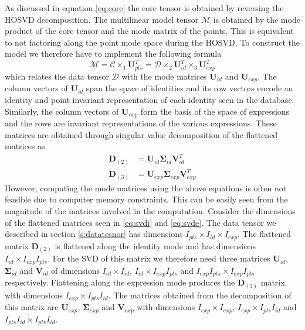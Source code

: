 \documentclass[11pt,a4paper]{report}
\begin{document}
As discussed in equation \ref{eq:core} the core tensor is obtained by reversing
the HOSVD decomposition. The multilinear model tensor $\mathcal{M}$ is obtained
by the mode product of the core tensor and the mode matrix of the points. This
is equivalent to not factoring along the point mode space during the HOSVD.
To construct the model we therefore have to implement the following formula
\begin{equation}\label{eq:model}
\mathcal{M} = \mathcal{C} \times_1 \mathbf{U}_{pts}^T = \mathcal{D} \times_2
\mathbf{U}_{id}^T \times_3 \mathbf{U}_{exp}^T
\end{equation}
which relates the data tensor $\mathcal{D}$ with the mode matrices $\mathbf{U}_{id}$
and $\mathbf{U}_{exp}$. The column vectors of $\mathbf{U}_{id}$ span the space
of identities and its row vectors encode an identity and point invariant
representation of each identity seen in the database. Similarly, the column
vectors of $\mathbf{U}_{exp}$ form the basis of the space of expressions and the
rows are invariant representations of the various expressions. These matrices
are obtained through singular value decomposition of the flattened
matrices as
\begin{align}\label{eq:svdi}
\mathbf{D}_{(2)} &= \mathbf{U}_{id} \mathbf{\Sigma}_{id} \mathbf{V}_{id}^T\\
\label{eq:svde}
\mathbf{D}_{(3)} &= \mathbf{U}_{exp} \mathbf{\Sigma}_{exp} \mathbf{V}_{exp}^T
\end{align}
However, computing the mode matrices using the above equations is often not
feasible due to computer memory constraints. This can be easily seen from the magnitude of the matrices
involved in the computation. Consider the dimensions of the flattened
matrices seen in \ref{eq:svdi} and \ref{eq:svde}. The data tensor we described
in section \ref{s:datatesnor} has
dimensions $I_{pts} \times I_{id} \times I_{exp}$. The flattened matrix
$\mathbf{D}_{(2)}$ is flattened along the identity mode and has dimensions
$I_{id} \times I_{exp}I_{pts}$. For the SVD of this matrix we therefore need
three matrices $\mathbf{U}_{id}$, $\mathbf{\Sigma}_{id}$ and $\mathbf{V}_{id}$
of dimensions $I_{id} \times I_{id}$, $I_{id} \times I_{exp}I_{pts}$ and
$I_{exp}I_{pts} \times I_{exp}I_{pts}$ respectively. Flattening along the expression mode produces
the $\mathbf{D}_{(3)}$ matrix with dimensions $I_{exp} \times
I_{pts}I_{id}$. The matrices obtained from the decomposition of this matrix are
$\mathbf{U}_{exp}$, $\mathbf{\Sigma}_{exp}$ and $\mathbf{V}_{exp}$ with
dimensions $I_{exp} \times I_{exp}$, $I_{exp} \times I_{pts}I_{id}$ and
$I_{pts}I_{id} \times I_{pts}I_{id}$.
\end{document}
